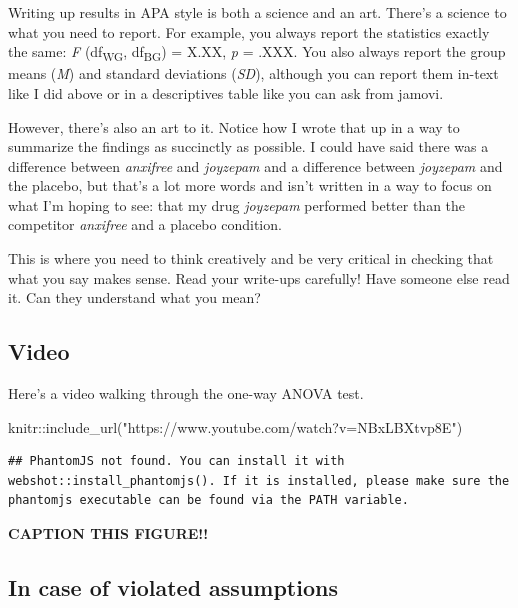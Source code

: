 \documentclass[
]{book}
\newenvironment{Shaded}{\begin{snugshade}}{\end{snugshade}}
\newcommand{\FunctionTok}[1]{\textcolor[rgb]{0.00,0.00,0.00}{#1}}
\newcommand{\NormalTok}[1]{#1}
\newcommand{\SpecialCharTok}[1]{\textcolor[rgb]{0.00,0.00,0.00}{#1}}
\newcommand{\StringTok}[1]{\textcolor[rgb]{0.31,0.60,0.02}{#1}}
\begin{document}
Writing up results in APA style is both a science and an art. There's a science to what you need to report. For example, you always report the statistics exactly the same: \emph{F} (df\textsubscript{WG}, df\textsubscript{BG}) = X.XX, \emph{p} = .XXX. You also always report the group means (\emph{M}) and standard deviations (\emph{SD}), although you can report them in-text like I did above or in a descriptives table like you can ask from jamovi.

However, there's also an art to it. Notice how I wrote that up in a way to summarize the findings as succinctly as possible. I could have said there was a difference between \emph{anxifree} and \emph{joyzepam} and a difference between \emph{joyzepam} and the placebo, but that's a lot more words and isn't written in a way to focus on what I'm hoping to see: that my drug \emph{joyzepam} performed better than the competitor \emph{anxifree} and a placebo condition.

This is where you need to think creatively and be very critical in checking that what you say makes sense. Read your write-ups carefully! Have someone else read it. Can they understand what you mean?

\hypertarget{video-6}{%
\subsection{Video}\label{video-6}}

Here's a video walking through the one-way ANOVA test.

\begin{Shaded}
\begin{Highlighting}[]
\NormalTok{knitr}\SpecialCharTok{::}\FunctionTok{include\_url}\NormalTok{(}\StringTok{"https://www.youtube.com/watch?v=NBxLBXtvp8E"}\NormalTok{)}
\end{Highlighting}
\end{Shaded}

\begin{verbatim}
## PhantomJS not found. You can install it with webshot::install_phantomjs(). If it is installed, please make sure the phantomjs executable can be found via the PATH variable.
\end{verbatim}

\label{fig:unnamed-chunk-1}\textbf{CAPTION THIS FIGURE!!}

\hypertarget{in-case-of-violated-assumptions-5}{%
\subsection{In case of violated assumptions}\label{in-case-of-violated-assumptions-5}}
\end{document}
